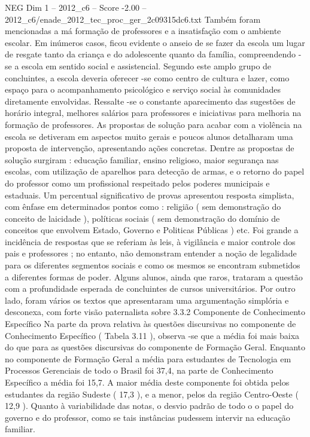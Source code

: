 \begin{textsample}{NEG Dim 1 – 2012\_c6 – Score -2.00 – 2012\_c6/enade\_2012\_tec\_proc\_ger\_2c09315dc6.txt}
Também foram mencionadas a má formação de professores e a insatisfação com o ambiente escolar.
Em inúmeros casos, ficou evidente o anseio de se fazer da escola um lugar de resgate tanto da criança e do adolescente quanto da família, compreendendo -se a escola em sentido social e assistencial.
Segundo este amplo grupo de concluintes, a escola deveria oferecer -se como centro de cultura e lazer, como espaço para o acompanhamento psicológico e serviço social às comunidades diretamente envolvidas.
Ressalte -se o constante aparecimento das sugestões de horário integral, melhores salários para professores e iniciativas para melhoria na formação de professores.
As propostas de solução para acabar com a violência na escola se detiveram em aspectos muito gerais e poucos alunos detalharam uma proposta de intervenção, apresentando ações concretas.
Dentre as propostas de solução surgiram : educação familiar, ensino religioso, maior segurança nas escolas, com utilização de aparelhos para detecção de armas, e o retorno do papel do professor como um profissional respeitado pelos poderes municipais e estaduais.
Um percentual significativo de provas apresentou resposta simplista, com ênfase em determinados pontos como : religião ( sem demonstração do conceito de laicidade ), políticas sociais ( sem demonstração do domínio de conceitos que envolvem Estado, Governo e Politicas Públicas ) etc.
Foi grande a incidência de respostas que se referiam às leis, à vigilância e maior controle dos pais e professores ; no entanto, não demonstram entender a noção de legalidade para os diferentes segmentos sociais e como os mesmos se encontram submetidos a diferentes formas de poder.
Alguns alunos, ainda que raros, trataram a questão com a profundidade esperada de concluintes de cursos universitários.
Por outro lado, foram vários os textos que apresentaram uma argumentação simplória e desconexa, com forte visão paternalista sobre 3.3.2 Componente de Conhecimento Específico Na parte da prova relativa às questões discursivas no componente de Conhecimento Específico ( Tabela 3.11 ), observa -se que a média foi mais baixa do que para as questões discursivas do componente de Formação Geral.
Enquanto no componente de Formação Geral a média para estudantes de Tecnologia em Processos Gerenciais de todo o Brasil foi 37,4, na parte de Conhecimento Específico a média foi 15,7.
A maior média deste componente foi obtida pelos estudantes da região Sudeste ( 17,3 ), e a menor, pelos da região Centro-Oeste ( 12,9 ).
Quanto à variabilidade das notas, o desvio padrão de todo o o papel do governo e do professor, como se tais instâncias pudessem intervir na educação familiar.

\end{textsample}
